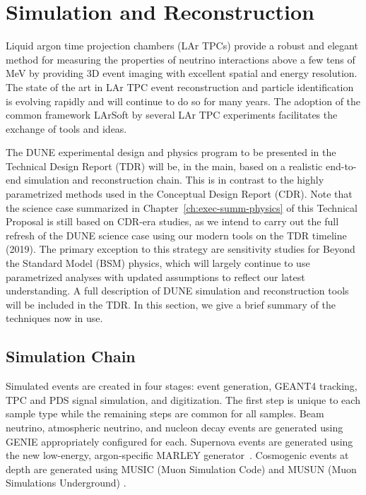 \section{Simulation and Reconstruction}
\label{sec:exec-summ-strat-simreco}

Liquid argon time projection chambers (LAr TPCs) provide a robust and elegant method for measuring the properties of neutrino interactions above a few tens of MeV by providing 3D event imaging with excellent spatial and energy resolution.  The state of the art in LAr TPC event reconstruction and particle identification is evolving rapidly and will continue to do so for many years.  The adoption of the common framework LArSoft by several LAr TPC experiments facilitates the exchange of tools and ideas.

The DUNE experimental design and physics program to be presented in the Technical Design Report (TDR) will be, in the main, based on a realistic end-to-end simulation and reconstruction chain.  This is in contrast to the highly parametrized methods used in the Conceptual Design Report (CDR).  Note that the science case summarized in Chapter~\ref{ch:exec-summ-physics} of this Technical Proposal is still based on CDR-era studies, as we intend to carry out the full refresh of the DUNE science case using our modern tools on the TDR timeline (2019).  The primary exception to this strategy are sensitivity studies for Beyond the Standard Model (BSM) physics, which will largely continue to use parametrized analyses with updated assumptions to reflect our latest understanding.  A full description of DUNE simulation and reconstruction tools will be included in the TDR.  In this section, we give a brief summary of the techniques now in use.

\subsection{Simulation Chain}
Simulated events are created in four stages: event generation, {\sc GEANT4} tracking, TPC and PDS signal simulation, and digitization.  The first step is unique to each sample type while the remaining steps are common for all samples. Beam neutrino, atmospheric neutrino, and nucleon decay events are generated using {\sc GENIE} appropriately configured for each.  Supernova events are generated using the new low-energy, argon-specific MARLEY generator~\cite{marley}.  Cosmogenic events at depth are generated using MUSIC (Muon Simulation Code) \cite{MUSICPaper} and MUSUN (Muon Simulations Underground) \cite{Kudryavtsev:musun}.

